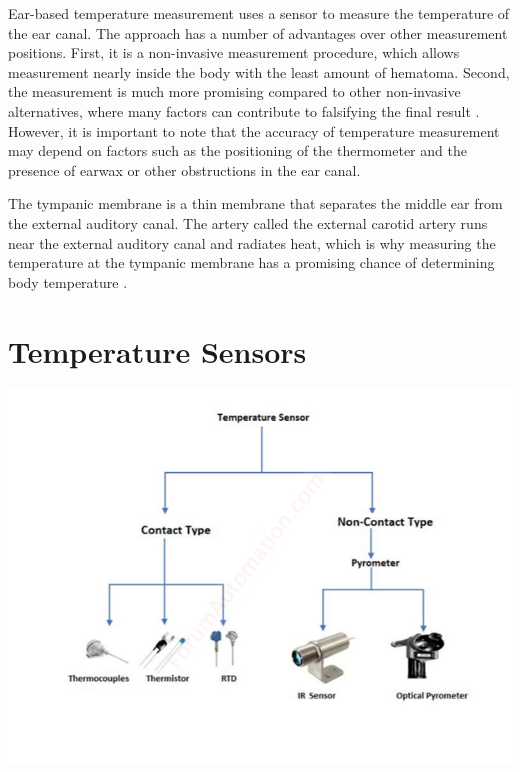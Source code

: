 Ear-based temperature measurement uses a sensor to measure the temperature of the ear canal. 
The approach has a number of advantages over other measurement positions.
First, it is a non-invasive measurement procedure, which allows measurement nearly inside the body with the least amount of hematoma.
Second, the measurement is much more promising compared to other non-invasive alternatives, where many factors can contribute to falsifying the final result \cite{ganioValidityReliabilityDevices2009, craigTemperatureMeasuredAxilla2000}. 
However, it is important to note that the accuracy of temperature measurement may depend on factors such as the positioning of the thermometer and the presence of earwax or other obstructions in the ear canal.

The tympanic membrane is a thin membrane that separates the middle ear from the external auditory canal. 
The artery called the external carotid artery runs near the external auditory canal and radiates heat, which is why measuring the temperature at the tympanic membrane has a promising chance of determining body temperature \cite{yeohRevisitingTympanicMembrane2017}.



\section{Temperature Sensors}
\label{Background:TemperatureSensors}
\includegraphics[scale=0.7]{thesis-doc/images/introduction/temp_sensor_types.png}

